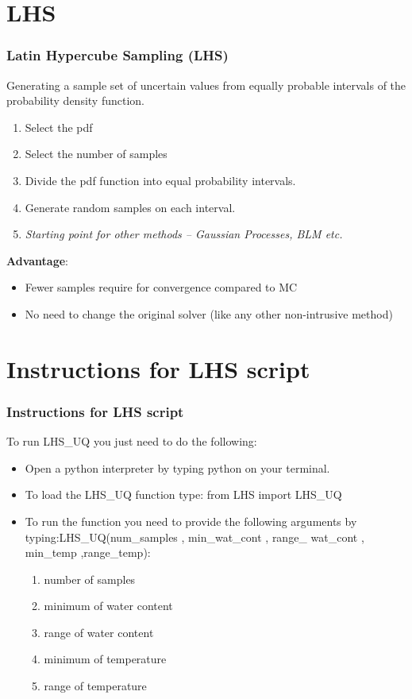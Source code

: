 \documentclass[10pt]{beamer}
\begin{document}
\section{LHS}
\begin{frame}
\frametitle{Latin Hypercube Sampling (LHS)}
Generating a sample set of uncertain values from equally probable intervals of the probability density function.\\

\begin{enumerate}
    \item Select the pdf
    \item Select the number of samples
    \item Divide the pdf function into equal probability intervals.
    \item Generate random samples on each interval.
    \item {\it Starting point for other methods -- Gaussian Processes, BLM etc.}
\end{enumerate}
{\bf Advantage}:
\begin{itemize}
    \item Fewer samples require for convergence compared to MC
    \item No need to change the original solver (like any other non-intrusive method)
\end{itemize}
\end{frame}
\section{Instructions for LHS script}
\begin{frame}
\frametitle{Instructions for LHS script}
To run LHS\_UQ you just need to do the following:
 \begin{itemize}
 
 \item Open a python interpreter by typing python on your terminal.
 
 \item To load the LHS\_UQ function type: from LHS import LHS\_UQ 
 
 \item To run the function you need to provide the following arguments by typing:\newline LHS\_UQ(num\_samples , min\_wat\_cont , range\_ wat\_cont , min\_temp ,range\_temp):
   \begin{enumerate}
 \item number of samples
 \item minimum of water content
 \item range of water content
 \item minimum of temperature
 \item range of temperature
 \end{enumerate}

 \end{itemize}

\end{frame}
\end{document}
